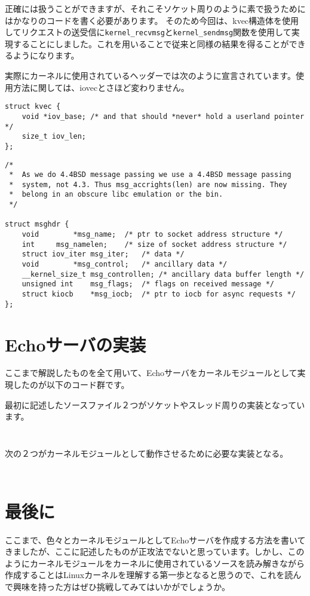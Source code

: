 正確には扱うことができますが、それこそソケット周りのように素で扱うためにはかなりのコードを書く必要があります。
そのため今回は、kvec構造体を使用してリクエストの送受信に\verb|kernel_recvmsg|と\verb|kernel_sendmsg|関数を使用して実現することにしました。これを用いることで従来と同様の結果を得ることができるようになります。

実際にカーネルに使用されているヘッダーでは次のように宣言されています。使用方法に関しては、iovecとさほど変わりません。
\begin{verbatim}
struct kvec {
    void *iov_base; /* and that should *never* hold a userland pointer */
    size_t iov_len;
};
\end{verbatim}
\begin{verbatim}
/*
 *  As we do 4.4BSD message passing we use a 4.4BSD message passing
 *  system, not 4.3. Thus msg_accrights(len) are now missing. They
 *  belong in an obscure libc emulation or the bin.
 */
 
struct msghdr {
    void        *msg_name;  /* ptr to socket address structure */
    int     msg_namelen;    /* size of socket address structure */
    struct iov_iter msg_iter;   /* data */
    void        *msg_control;   /* ancillary data */
    __kernel_size_t msg_controllen; /* ancillary data buffer length */
    unsigned int    msg_flags;  /* flags on received message */
    struct kiocb    *msg_iocb;  /* ptr to iocb for async requests */
};
\end{verbatim}

\section{Echoサーバの実装}
ここまで解説したものを全て用いて、Echoサーバをカーネルモジュールとして実現したのが以下のコード群です。

最初に記述したソースファイル２つがソケットやスレッド周りの実装となっています。
\inputminted[frame=lines,framesep=2mm,baselinestretch=1.2,fontsize=\footnotesize,linenos,breaklines]{c}{\lrfasset/echo_server.c}
\inputminted[frame=lines,framesep=2mm,baselinestretch=1.2,fontsize=\footnotesize,linenos,breaklines]{c}{\lrfasset/echo_server.h}
次の２つがカーネルモジュールとして動作させるために必要な実装となる。
\inputminted[frame=lines,framesep=2mm,baselinestretch=1.2,fontsize=\footnotesize,linenos,breaklines]{c}{\lrfasset/fastecho.h}
\inputminted[frame=lines,framesep=2mm,baselinestretch=1.2,fontsize=\footnotesize,linenos,breaklines]{c}{\lrfasset/fastecho_module.c}

\section{最後に}
ここまで、色々とカーネルモジュールとしてEchoサーバを作成する方法を書いてきましたが、ここに記述したものが正攻法でないと思っています。しかし、このようにカーネルモジュールをカーネルに使用されているソースを読み解きながら作成することはLinuxカーネルを理解する第一歩となると思うので、これを読んで興味を持った方はぜひ挑戦してみてはいかがでしょうか。


